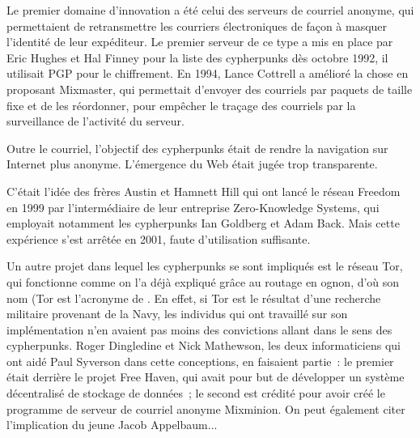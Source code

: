 Le premier domaine d'innovation a été celui des serveurs de courriel anonyme, qui permettaient de retransmettre les courriers électroniques de façon à masquer l'identité de leur expéditeur. Le premier serveur de ce type a mis en place par Eric Hughes et Hal Finney pour la liste des cypherpunks dès octobre 1992, il utilisait PGP pour le chiffrement. En 1994, Lance Cottrell a amélioré la chose en proposant Mixmaster, qui permettait d'envoyer des courriels par paquets de taille fixe et de les réordonner, pour empêcher le traçage des courriels par la surveillance de l'activité du serveur. %

Outre le courriel, l'objectif des cypherpunks était de rendre la navigation sur Internet plus anonyme. L'émergence du Web était jugée trop transparente.

C'était l'idée des frères Austin et Hamnett Hill qui ont lancé le réseau Freedom en 1999 par l'intermédiaire de leur entreprise Zero-Knowledge Systems, qui employait notamment les cypherpunks Ian Goldberg et Adam Back. Mais cette expérience s'est arrêtée en 2001, faute d'utilisation suffisante.

Un autre projet dans lequel les cypherpunks se sont impliqués est le réseau Tor, qui fonctionne comme on l'a déjà expliqué grâce au routage en ognon, d'où son nom (Tor est l'acronyme de . En effet, si Tor est le résultat d'une recherche militaire provenant de la Navy, les individus qui ont travaillé sur son implémentation n'en avaient pas moins des convictions allant dans le sens des cypherpunks. Roger Dingledine et Nick Mathewson, les deux informaticiens qui ont aidé Paul Syverson dans cette conceptions, en faisaient partie~: le premier était derrière le projet Free Haven, qui avait pour but de développer un système décentralisé de stockage de données~; le second est crédité pour avoir créé le programme de serveur de courriel anonyme Mixminion. On peut également citer l'implication du jeune Jacob Appelbaum...

